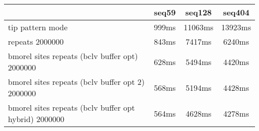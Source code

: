 \begin{tabular}{|l|c|c|c|}
\hline
 & seq59 & seq128 & seq404  \\
\hline
tip pattern mode &  999ms &  11063ms &  13923ms\\
\hline
repeats 2000000 &  843ms &  7417ms &  6240ms\\
\hline
bmorel sites repeats (bclv buffer opt) 2000000 &  628ms &  5494ms &  4420ms\\
\hline
bmorel sites repeats (bclv buffer opt 2) 2000000 &  568ms &  5194ms &  4428ms\\
\hline
bmorel sites repeats (bclv buffer opt hybrid) 2000000 &  564ms &  4628ms &  4278ms\\
\hline
\end{tabular}
